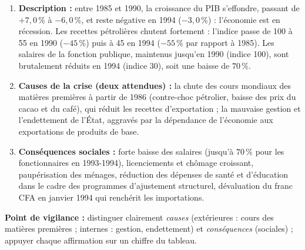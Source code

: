 \documentclass[11pt]{article}
\begin{document}
\begin{corrige}
\begin{enumerate}
\item \textbf{Description :} entre 1985 et 1990, la croissance du PIB s'effondre, passant de $+7,0\,\%$ à $-6,0\,\%$, et reste négative en 1994 ($-3,0\,\%$) : l'économie est en récession. Les recettes pétrolières chutent fortement : l'indice passe de 100 à 55 en 1990 ($-45\,\%$) puis à 45 en 1994 ($-55\,\%$ par rapport à 1985). Les salaires de la fonction publique, maintenus jusqu'en 1990 (indice 100), sont brutalement réduits en 1994 (indice 30), soit une baisse de $70\,\%$.
\item \textbf{Causes de la crise (deux attendues) :} la chute des cours mondiaux des matières premières à partir de 1986 (contre-choc pétrolier, baisse des prix du cacao et du café), qui réduit les recettes d'exportation ; la mauvaise gestion et l'endettement de l'État, aggravés par la dépendance de l'économie aux exportations de produits de base.
\item \textbf{Conséquences sociales :} forte baisse des salaires (jusqu'à $70\,\%$ pour les fonctionnaires en 1993-1994), licenciements et chômage croissant, paupérisation des ménages, réduction des dépenses de santé et d'éducation dans le cadre des programmes d'ajustement structurel, dévaluation du franc CFA en janvier 1994 qui renchérit les importations.
\end{enumerate}
\textbf{Point de vigilance :} distinguer clairement \emph{causes} (extérieures : cours des matières premières ; internes : gestion, endettement) et \emph{conséquences} (sociales) ; appuyer chaque affirmation sur un chiffre du tableau.
\end{corrige}
\end{document}
